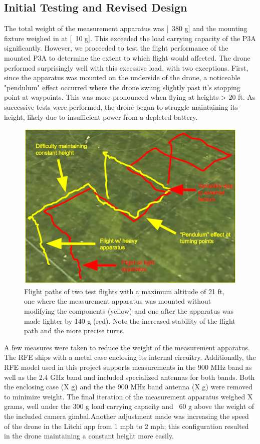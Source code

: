 \documentclass[pageno]{jpaper}
\begin{document}
 \subsection{Initial Testing and Revised Design}
 The total weight of the measurement apparatus was [~380 g] and the mounting fixture weighed in at [~10 g]. This exceeded the load carrying capacity of the P3A significantly. However, we proceeded to test the flight performance of the mounted P3A to determine the extent to which flight would affected. The drone performed surprisingly well with  this excessive load, with two exceptions. First, since the apparatus was mounted on the underside of the drone, a noticeable "pendulum" effect occurred where the drone swung slightly past it's stopping point at waypoints. This was more pronounced when flying at heights > 20 ft. As successive tests were performed, the drone began to struggle maintaining its height, likely due to insufficient power from a depleted battery. 
 
 \begin{figure}[h]
 	\caption{Flight paths of two test flights with a maximum altitude of 21 ft, one where the measurement apparatus was mounted without modifying the components (yellow) and one after the apparatus was made lighter by 140 g (red). Note the increased stability of the flight path and the more precise turns. }
 	\includegraphics{performance_comparison}
 	\centering
 \end{figure}
 
 A few measures were taken to reduce the weight of the measurement apparatus. The RFE ships with a metal case enclosing its internal circuitry. Additionally, the RFE model used in this project supports measurements in the 900 MHz band as well as the 2.4 GHz band and included specialized antennas for both bands. Both the enclosing case (X g) and the the 900 MHz band antenna (X g) were removed to minimize weight. The final iteration of the measurement apparatus weighed X grams, well under the 300 g load carrying capacity and ~60 g above the weight of the included camera gimbal.Another adjustment made was increasing the speed of the drone in the Litchi app from 1 mph to 2 mph; this configuration resulted in the drone maintaining a constant height more easily.
 

 
 
\end{document}
